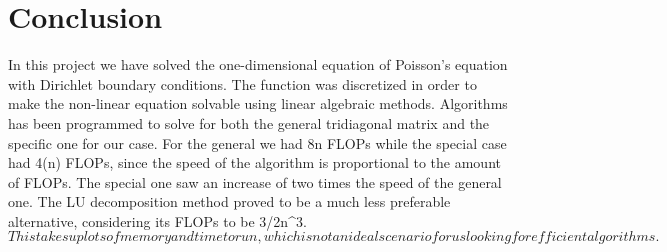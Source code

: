\documentclass{article}
\begin{document}
\section{Conclusion}
In this project we have solved the one-dimensional equation of Poisson's equation with Dirichlet boundary conditions. The function was discretized in order to make the non-linear equation solvable using linear algebraic methods. Algorithms has been programmed to solve for both the general tridiagonal matrix and the specific one for our case. For the general we had 8n FLOPs while the special case had 4(n) FLOPs, since the speed of the algorithm is proportional to the amount of FLOPs. The special one saw an increase of two times the speed of the general one. The LU decomposition method proved to be a much less preferable alternative, considering its FLOPs to be {3/2n^3}.$ This takes up lots of memory and time to run , which is not an ideal scenario for us looking for efficient algorithms.$


\citep{CompFys2015MHJ}






\end{document}
